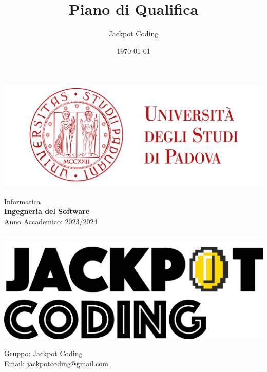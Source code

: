 \documentclass[5pt]{article}
\title{Piano di Qualifica}
\author{Jackpot Coding}
\date{\today}
\begin{document}
	
	
	
	\vspace{8pt}
		\includegraphics[scale=0.2]{UNIPDFull.png}
	
	\vspace{30pt}
	
	\begin{minipage}[t]{0.48\textwidth}
		\begin{flushleft}
			Informatica\\
			\vspace{5pt}
			\textbf{\LARGE Ingegneria del Software}\\
			Anno Accademico: 2023/2024
		\end{flushleft}
	\end{minipage}
	
	
	\vspace{5px}
	
	
	\rule{\textwidth}{5pt}
	
	\begin{minipage}[t]{0.50\textwidth}
		\begin{flushleft}
			\hspace{10pt}
				\includegraphics[scale=0.65]{jackpot-logo.png} 
		\end{flushleft}
	\end{minipage}
	\hspace{-60pt} %
	\begin{flushright}
		\begin{minipage}[t]{0.50\textwidth}
			\begin{flushright}
				Gruppo: {\Large Jackpot Coding}\\
				Email: \href{mailto:jackpotcoding@gmail.com}{jackpotcoding@gmail.com}
			\end{flushright}
		\end{minipage}
	\end{flushright}
	
\end{document}
